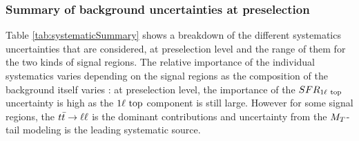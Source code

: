             \subsubsection{Summary of background uncertainties at preselection}

            Table \ref{tab:systematicSummary} shows a breakdown of the different systematics
            uncertainties that are considered, at preselection level and the range of them
            for the two kinds of signal regions. The relative importance of the individual
            systematics varies depending on the signal regions as the composition of the
            background itself varies : at preselection level, the importance of the
            $SFR_{1\ell~\text{top}}$ uncertainty is high as the $1\ell~\text{top}$ component is still large.
            However for some signal regions, the $t\bar{t} \rightarrow \ell \ell$ is the dominant contributions and
            uncertainty from the $M_T$-tail modeling is the leading systematic source.


